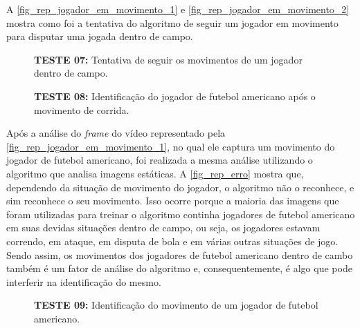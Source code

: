 A \autoref{fig_rep_jogador_em_movimento_1} e \autoref{fig_rep_jogador_em_movimento_2} mostra como foi a tentativa do algoritmo de seguir um jogador em movimento para disputar uma jogada dentro de campo.

\begin{figure}[ht]
	\caption{\label{fig_rep_jogador_em_movimento_1}\textbf{TESTE 07:} Tentativa de seguir os movimentos de um jogador dentro de campo.}
	\begin{center}
	\end{center}
	\centering {}
\end{figure}


\begin{figure}[ht]
	\caption{\label{fig_rep_jogador_em_movimento_2}\textbf{TESTE 08:} Identificação do jogador de futebol americano após o movimento de corrida.}
	\begin{center}
	\end{center}
	\centering {}
\end{figure}

Após a análise do \textit{frame} do vídeo representado pela \autoref{fig_rep_jogador_em_movimento_1}, no qual ele captura um movimento do jogador de futebol americano, foi realizada a mesma análise utilizando o algoritmo que analisa imagens estáticas. A \autoref{fig_rep_erro} mostra que, dependendo da situação de movimento do jogador, o algoritmo não o reconhece, e sim reconhece o seu movimento. Isso ocorre porque a maioria das imagens que foram utilizadas para treinar o algoritmo continha jogadores de futebol americano em suas devidas situações dentro de campo, ou seja, os jogadores estavam correndo, em ataque, em disputa de bola e em várias outras situações de jogo. Sendo assim, os movimentos dos jogadores de futebol americano dentro de cambo também é um fator de análise do algoritmo e, consequentemente, é algo que pode interferir na identificação do mesmo.

\clearpage

\begin{figure}[ht]
	\caption{\label{fig_rep_erro}\textbf{TESTE 09:} Identificação do movimento de um jogador de futebol americano.}
	\begin{center}
	\end{center}
	\centering {}
\end{figure}

